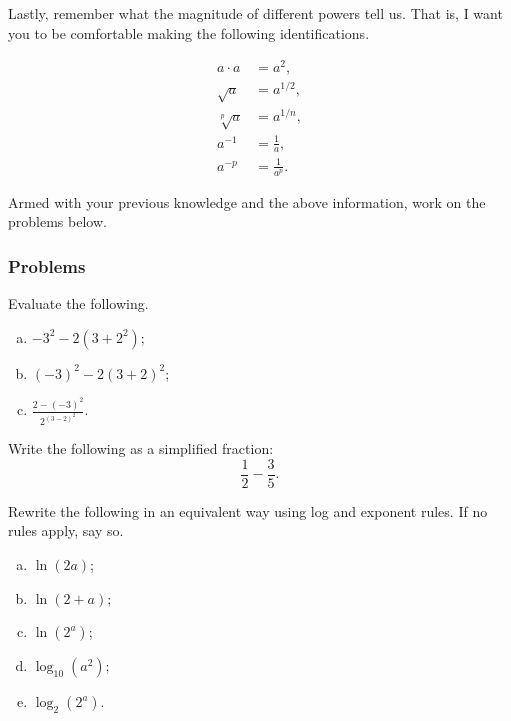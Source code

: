     Lastly, remember what the magnitude of different powers tell us.  That is, I want you to be comfortable making the following identifications.
    
    \begin{align*}
        a\cdot a &= a^2,\\
        \sqrt{a} &= a^{1/2},\\
        \sqrt[p]{a} &= a^{1/n},\\
        a^{-1} &= \frac{1}{a},\\
        a^{-p} &= \frac{1}{a^p}.
    \end{align*}
    
    Armed with your previous knowledge and the above information, work on the problems below.
    
    \subsubsection{Problems}
    
    \begin{problem}
    Evaluate the following.
    \begin{enumerate}[(a)]
        \item $-3^2-2(3+2^2)$;
        \item $(-3)^2-2(3+2)^2$;
        \item $\frac{2-(-3)^2}{2^{(3-2)^2}}$.
    \end{enumerate}
    \end{problem}
    
    \begin{problem}
    Write the following as a simplified fraction:
    \[
    \frac{1}{2}-\frac{3}{5}.
    \]
    \end{problem}
    
    \begin{problem}
    Rewrite the following in an equivalent way using log and exponent rules. If no rules apply, say so.
    \begin{enumerate}[(a)]
        \item $\ln(2a)$;
        \item $\ln(2+a)$;
        \item $\ln(2^a)$;
        \item $\log_{10}(a^2)$;
        \item $\log_2(2^a)$.
    \end{enumerate}
    \end{problem}
    
